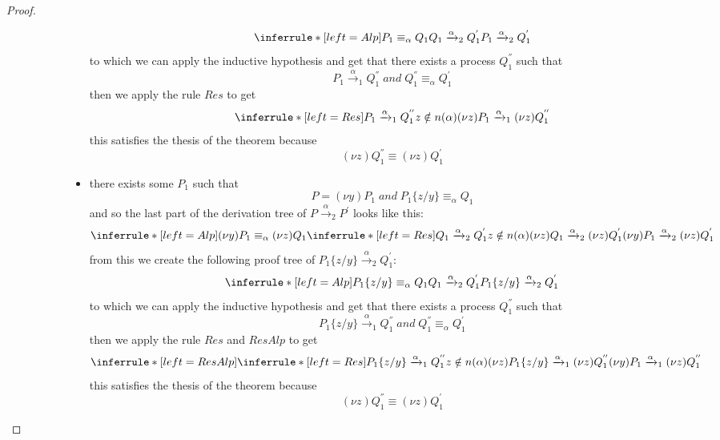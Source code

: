 \begin{theorem}
\begin{proof}
\begin{description}
\begin{description}
\begin{itemize}
		\[
		  \inferrule* [left=Alp]{
		      P_{1}\equiv_{\alpha}Q_{1}
		    \\
		      Q_{1}\xrightarrow{\alpha}_{2}Q_{1}^{'}
		  }{
		    P_{1}\xrightarrow{\alpha}_{2}Q_{1}^{'}
		  }		
		\]
		to which we can apply the inductive hypothesis and get that there exists a process $Q_{1}^{''}$ such that
		\[
		  P_{1}\xrightarrow{\alpha}_{1}Q_{1}^{''}\;and\; Q_{1}^{''}\equiv_{\alpha}Q_{1}^{'}
		\]
		then we apply the rule $Res$ to get
		\[
		      \inferrule* [left=Res]{
			  P_{1}\xrightarrow{\alpha}_{1}Q_{1}^{''}
			\\
			  z\notin n(\alpha)
		      }{
			(\nu z)P_{1}\xrightarrow{\alpha}_{1}(\nu z)Q_{1}^{''}
		      }		 
		\]
		this satisfies the thesis of the theorem because  
		\[
		  (\nu z)Q_{1}^{''}\equiv(\nu z)Q_{1}^{'}
		\]
	      \item
		there exists some $P_{1}$ such that 
		\[
		  P=(\nu y)P_{1}\; and\; P_{1}\{z/y\}\equiv_{\alpha}Q_{1}
		\]
		and so the last part of the derivation tree of $P\xrightarrow{\alpha}_{2}P^{'}$ looks like this:
		\[
		  \inferrule* [left=Alp]{
		      (\nu y)P_{1}\equiv_{\alpha}(\nu z)Q_{1}
		    \\
		      \inferrule* [left=Res]{
			  Q_{1}\xrightarrow{\alpha}_{2}Q_{1}^{'}
			\\
			  z\notin n(\alpha)
		      }{
			(\nu z)Q_{1}\xrightarrow{\alpha}_{2}(\nu z)Q_{1}^{'}
		      }
		  }{
		    (\nu y)P_{1}\xrightarrow{\alpha}_{2}(\nu z)Q_{1}^{'}
		  }
		\]
		from this we create the following proof tree of $P_{1}\{z/y\}\xrightarrow{\alpha}_{2}Q_{1}^{'}$:
		\[
		  \inferrule* [left=Alp]{
		      P_{1}\{z/y\}\equiv_{\alpha}Q_{1}
		    \\
		      Q_{1}\xrightarrow{\alpha}_{2}Q_{1}^{'}
		  }{
		    P_{1}\{z/y\}\xrightarrow{\alpha}_{2}Q_{1}^{'}
		  }		
		\]
		to which we can apply the inductive hypothesis and get that there exists a process $Q_{1}^{''}$ such that
		\[
		  P_{1}\{z/y\}\xrightarrow{\alpha}_{1}Q_{1}^{''}\;and\; Q_{1}^{''}\equiv_{\alpha}Q_{1}^{'}
		\]
		then we apply the rule $Res$ and $ResAlp$ to get
		\[
		  \inferrule* [left=ResAlp]{
		      \inferrule* [left=Res]{
			  P_{1}\{z/y\} \xrightarrow{\alpha}_{1}Q_{1}^{''}
			\\
			  z\notin n(\alpha)
		      }{
			(\nu z)P_{1}\{z/y\} \xrightarrow{\alpha}_{1}(\nu z)Q_{1}^{''}
		      }		 
		  }{
		    (\nu y)P_{1} \xrightarrow{\alpha}_{1}(\nu z)Q_{1}^{''}
		  }
		\]
		this satisfies the thesis of the theorem because  
		\[
		  (\nu z)Q_{1}^{''}\equiv(\nu z)Q_{1}^{'}
		\]
	    \end{itemize}

\end{description}
\end{description}
\end{proof}
\end{theorem}
